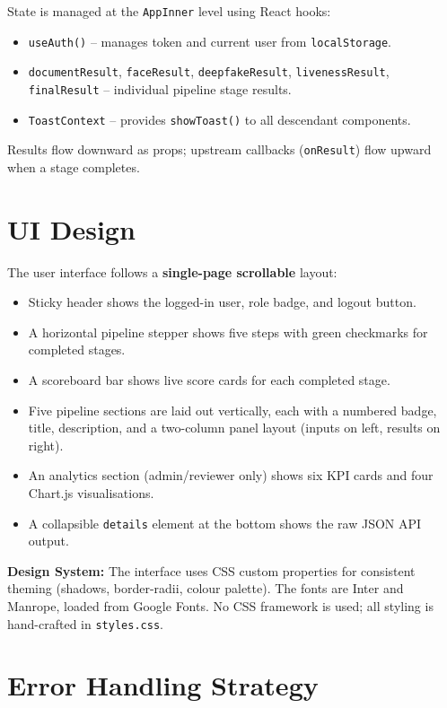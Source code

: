 State is managed at the \texttt{AppInner} level using React hooks:

\begin{itemize}
    \item \texttt{useAuth()} -- manages token and current user from \texttt{localStorage}.
    \item \texttt{documentResult}, \texttt{faceResult}, \texttt{deepfakeResult}, \texttt{livenessResult}, \texttt{finalResult} -- individual pipeline stage results.
    \item \texttt{ToastContext} -- provides \texttt{showToast()} to all descendant components.
\end{itemize}

Results flow downward as props; upstream callbacks (\texttt{onResult}) flow upward when a stage completes.

\section{UI Design}

The user interface follows a \textbf{single-page scrollable} layout:
\begin{itemize}
    \item Sticky header shows the logged-in user, role badge, and logout button.
    \item A horizontal pipeline stepper shows five steps with green checkmarks for completed stages.
    \item A scoreboard bar shows live score cards for each completed stage.
    \item Five pipeline sections are laid out vertically, each with a numbered badge, title, description, and a two-column panel layout (inputs on left, results on right).
    \item An analytics section (admin/reviewer only) shows six KPI cards and four Chart.js visualisations.
    \item A collapsible \texttt{details} element at the bottom shows the raw JSON API output.
\end{itemize}

\textbf{Design System:} The interface uses CSS custom properties for consistent theming (shadows, border-radii, colour palette). The fonts are Inter and Manrope, loaded from Google Fonts. No CSS framework is used; all styling is hand-crafted in \texttt{styles.css}.

\section{Error Handling Strategy}

